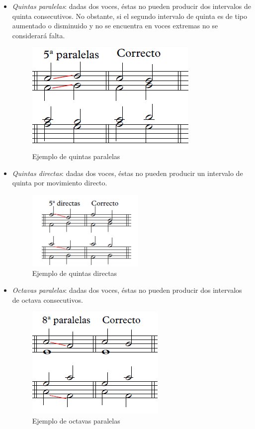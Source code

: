 \begin{itemize}

	\item \textit{Quintas paralelas}: dadas dos voces, éstas no pueden producir dos intervalos de quinta consecutivos. No obstante, si el segundo intervalo de quinta es de tipo aumentado o disminuido y no se encuentra en voces extremas no se considerará falta.

	\begin{figure}[H]
		\centering
		\includegraphics[scale=0.7]{imagenes/5paralelas.png}
		\caption{Ejemplo de quintas paralelas}
		\label{fig2.1.1}
	\end{figure}

	\item \textit{Quintas directas}: dadas dos voces, éstas no pueden producir un intervalo de quinta por movimiento directo.

	\begin{figure}[H]
		\centering
		\includegraphics[scale=0.7]{imagenes/5directas.png}
		\caption{Ejemplo de quintas directas}
		\label{fig2.1.2}
	\end{figure}

	\item \textit{Octavas paralelas}: dadas dos voces, éstas no pueden producir dos intervalos de octava consecutivos. 

	\begin{figure}[H]
		\centering
		\includegraphics[scale=0.7]{imagenes/8paralelas.png}
		\caption{Ejemplo de octavas paralelas}
		\label{fig2.1.3}
	\end{figure}


\end{itemize}
